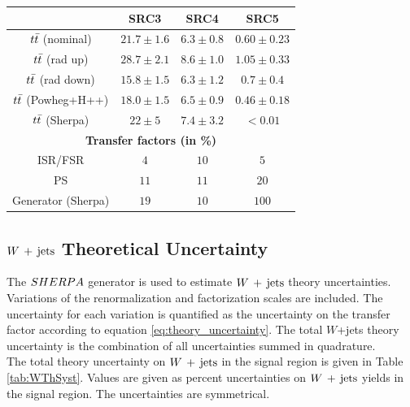 \begin{table}[!h]
\begin{center}
      \begin{tabular}{|c|c|c|c|}
	\noalign{\smallskip}\noalign{\smallskip}\hline
          & SRC3 & SRC4 & SRC5 \\
        \hline
$t\bar{t}$ (nominal) &         $21.7\pm 1.6 $&         $6.3\pm 0.8 $&          $0.60\pm 0.23 $\\
$t\bar{t}$ (rad up)&         $28.7\pm 2.1 $&         $8.6\pm 1.0 $&  $1.05\pm 0.33 $\\
$t\bar{t}$ (rad down)&         $15.8\pm 1.5 $&         $6.3\pm 1.2 $&  $0.7\pm 0.4 $\\
$t\bar{t}$ (Powheg+H++)&         $18.0\pm 1.5 $&         $6.5\pm 0.9 $&  $0.46\pm 0.18 $\\
$t\bar{t}$ (Sherpa)&     $22\pm 5 $&     $7.4\pm 3.2 $&          $<0.01$\\        
        \hline
        \multicolumn{4}{c}{\bf Transfer factors (in \%)} \\ \hline
        ISR/FSR  &   $4$&    $10$&   $5$\\
        PS &    $11$&   $11$&   $20$\\
        Generator (Sherpa)  &    $19$&   $10$&   $100$\\
        \hline       
        \end{tabular}
       
        
    \end{center}
  \end{table}

\subsection{$W\,+\,\mathrm{jets}$ Theoretical Uncertainty}

\indent The $SHERPA$ generator is used to estimate $W\,+\,\mathrm{jets}$ theory uncertainties.  Variations of the renormalization and factorization scales are included.  The uncertainty for each variation is quantified as the uncertainty on the transfer factor according to equation \ref{eq:theory_uncertainty}.  The total $W$+jets theory uncertainty is the combination of all uncertainties summed in quadrature. \\

\indent The total theory uncertainty on $W\,+\,\mathrm{jets}$ in the signal region is given in Table \ref{tab:WThSyst}.  Values are given as percent uncertainties on $W\,+\,\mathrm{jets}$ yields in the signal region.  The uncertainties are symmetrical. \\

